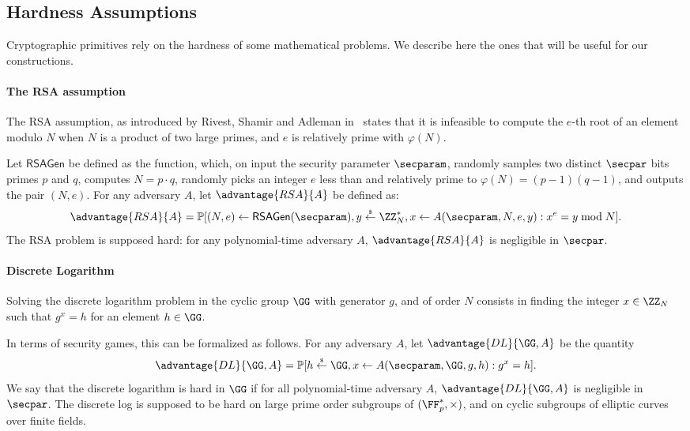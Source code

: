 

\subsection{Hardness Assumptions} %
\label{sub:hardness_assumptions}

Cryptographic primitives rely on the hardness of some mathematical problems.
We describe here the ones that will be useful for our constructions.


\paragraph{The RSA assumption} %
\label{par:rsa_assumption}

The RSA assumption, as introduced by Rivest, Shamir and Adleman in~\cite{RSA78} 
states that it is infeasible to compute the $e$-th root of an element modulo $N$ when $N$ is a product of two large primes, and $e$ is relatively prime with $\varphi(N)$.

Let $\mathsf{RSAGen}$ be defined as the function, which, on input the security parameter $\secparam$, randomly samples two distinct $\secpar$ bits primes $p$ and $q$, computes $N = p \cdot q$, randomly picks an integer $e$ less than and relatively prime to $\varphi(N) = (p-1)(q-1)$, and outputs the pair $(N,e)$.
For any adversary $A$, let $\advantage{RSA}{A}$ be defined as:
\[
	\advantage{RSA}{A} = \Prob[(N,e) \gets \mathsf{RSAGen}(\secparam), y \getsr \ZZ^*_N, x \gets A(\secparam, N,e,y) : x^e = y \bmod N].
\]
The RSA problem is supposed hard: for any polynomial-time adversary $A$, $\advantage{RSA}{A}$ is negligible in $\secpar$.


\paragraph{Discrete Logarithm} %
\label{par:discrete_logarithm}

Solving the discrete logarithm problem in the cyclic group $\GG$ with generator $g$, and of order $N$ consists in finding the integer $x \in \ZZ_N$ such that $g^x = h$ for an element $h \in \GG$.

In terms of security games, this can be formalized as follows.
For any adversary $A$, let $\advantage{DL}{\GG, A}$ be the quantity
\[
	\advantage{DL}{\GG, A} = \Prob[h \getsr \GG, x \gets A(\secparam, \GG, g, h) :  g^x = h ].
\]
We say that the discrete logarithm is hard in $\GG$ if for all polynomial-time adversary $A$, $\advantage{DL}{\GG, A}$ is negligible in $\secpar$.
The discrete log is supposed to be hard on large prime order subgroups of $(\FF_p^*, \times)$, and on cyclic subgroups of elliptic curves over finite fields.


